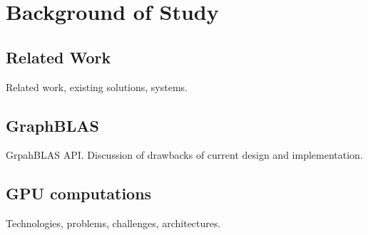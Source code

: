 \section{Background of Study}

\subsection{Related Work}
Related work, existing solutions, systems.  

\subsection{GraphBLAS}
GrpahBLAS API.
Discussion of drawbacks of current design and implementation.

\subsection{GPU computations}
Technologies, problems, challenges, architectures.
